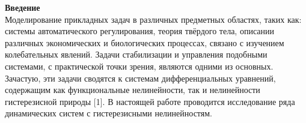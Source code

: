 \vzmscaption

\textbf{Введение}\\
Моделирование прикладных задач в различных предметных областях, таких как: системы автоматического регулирования, теория твёрдого тела, описании различных экономических и биологических процессах, связано с изучением колебательных явлений. Задачи стабилизации и управления подобными системами, с практической точки зрения, являются одними из основных. Зачастую, эти задачи сводятся к системам дифференциальных уравнений, содержащим как функциональные нелинейности, так и нелинейности гистерезисной природы [1]. В настоящей работе проводится исследование ряда динамических систем с гистерезисными нелинейностям.\\

